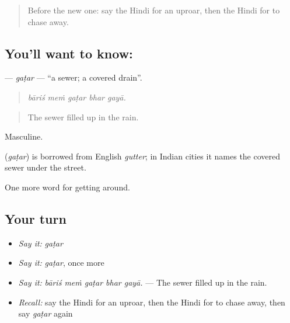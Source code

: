 \label{lesson:HI-C425-gatar}



\begin{quote}
Before the new one: say the Hindi for an uproar, then the Hindi for to chase away.
\end{quote}

\subsection*{You'll want to know: }
\textbf{} — \emph{gaṭar} — \textquotedblleft{}a sewer; a covered drain\textquotedblright{}.

\begin{quote}
    
\end{quote}

\begin{quote}
\emph{bāriś meṁ gaṭar bhar gayā.}
\end{quote}

\begin{quote}
The sewer filled up in the rain.
\end{quote}

Masculine.

\begin{cousinweb}
\textbf{} (\emph{gaṭar}) is borrowed from English \emph{gutter}; in Indian cities it names the covered sewer under the street.
\end{cousinweb}

\begin{grammarlens}[title={What you've built}]
One more word for getting around.
\end{grammarlens}

\subsection*{Your turn}
\begin{itemize}
\raggedright
  \item \emph{Say it:} \emph{gaṭar}
  \item \emph{Say it:} \emph{gaṭar}, once more
  \item \emph{Say it:} \emph{bāriś meṁ gaṭar bhar gayā.} — The sewer filled up in the rain.
  \item \emph{Recall:} say the Hindi for an uproar, then the Hindi for to chase away, then say \emph{gaṭar} again
\end{itemize}

